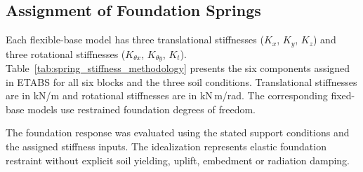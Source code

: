 \subsection{Assignment of Foundation Springs}
Each flexible-base model has three translational stiffnesses ($K_x$, $K_y$, $K_z$) and three rotational stiffnesses ($K_{\theta x}$, $K_{\theta y}$, $K_t$). Table~\ref{tab:spring_stiffness_methodology} presents the six components assigned in ETABS for all six blocks and the three soil conditions. Translational stiffnesses are in kN/m and rotational stiffnesses are in kN\,m/rad. The corresponding fixed-base models use restrained foundation degrees of freedom.

The foundation response was evaluated using the stated support conditions and the assigned stiffness inputs. The idealization represents elastic foundation restraint without explicit soil yielding, uplift, embedment or radiation damping.

